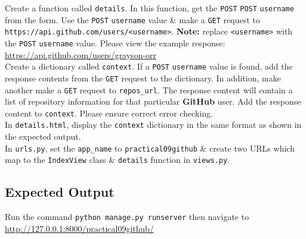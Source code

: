 \documentclass{article}
\begin{document}
Create a function called \texttt{details}. In this function, get the \texttt{POST} \texttt{POST} \texttt{username} from the form. Use the \texttt{POST} \texttt{username} value \& make a \texttt{GET} request to \texttt{https://api.github.com/users/<username>}. \textbf{Note:} replace \texttt{<username>} with the \texttt{POST} \texttt{username} value. Please view the example response: \href{https://api.github.com/users/grayson-orr}{https://api.github.com/users/grayson-orr} \\

Create a dictionary called \texttt{context}. If a \texttt{POST} \texttt{username} value is found, add the response contents from the \texttt{GET} request to the dictionary. In addition, make another make a \texttt{GET} request to \texttt{repos\_url}. The response content will contain a list of repository information for that particular \textbf{GitHub} user. Add the response content to \texttt{context}. Please ensure correct error checking. \\

In \texttt{details.html}, display the \texttt{context} dictionary in the same format as shown in the expected output.\\

In \texttt{urls.py}, set the \texttt{app\_name} to \texttt{practical09github} \& create two URLs which map to the \texttt{IndexView} class \& \texttt{details} function in \texttt{views.py}.

\subsection*{Expected Output} 
Run the command \texttt{python manage.py runserver} then navigate to \href{http://127.0.0.1:8000/practical09github/}{http://127.0.0.1:8000/practical09github/} \\
\end{document}
